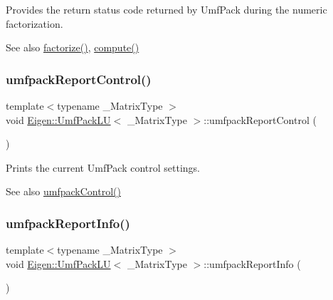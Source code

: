 Provides the return status code returned by Umf\+Pack during the numeric factorization.

\begin{DoxySeeAlso}{See also}
\mbox{\hyperlink{class_eigen_1_1_umf_pack_l_u_a1471bf890503e743c45d75cc02a5345d}{factorize()}}, \mbox{\hyperlink{class_eigen_1_1_umf_pack_l_u_a05fb2b5717ebd67e46b83439721ceee7}{compute()}} 
\end{DoxySeeAlso}
\mbox{\label{class_eigen_1_1_umf_pack_l_u_ac6ff58ef8eb8221e6af87de750d6619b}} 
\subsubsection{\texorpdfstring{umfpackReportControl()}{umfpackReportControl()}}
{\footnotesize\ttfamily template$<$typename \+\_\+\+Matrix\+Type $>$ \\
void \mbox{\hyperlink{class_eigen_1_1_umf_pack_l_u}{Eigen\+::\+Umf\+Pack\+LU}}$<$ \+\_\+\+Matrix\+Type $>$\+::umfpack\+Report\+Control (\begin{DoxyParamCaption}{ }\end{DoxyParamCaption})\hspace{0.3cm}{\ttfamily [inline]}}

Prints the current Umf\+Pack control settings.

\begin{DoxySeeAlso}{See also}
\mbox{\hyperlink{class_eigen_1_1_umf_pack_l_u_a679bd267a0407d4ca985d97f0b864101}{umfpack\+Control()}} 
\end{DoxySeeAlso}
\mbox{\label{class_eigen_1_1_umf_pack_l_u_afad062dfc49ca6d2d19d534b3f8f8d28}} 
\subsubsection{\texorpdfstring{umfpackReportInfo()}{umfpackReportInfo()}}
{\footnotesize\ttfamily template$<$typename \+\_\+\+Matrix\+Type $>$ \\
void \mbox{\hyperlink{class_eigen_1_1_umf_pack_l_u}{Eigen\+::\+Umf\+Pack\+LU}}$<$ \+\_\+\+Matrix\+Type $>$\+::umfpack\+Report\+Info (\begin{DoxyParamCaption}{ }\end{DoxyParamCaption})\hspace{0.3cm}{\ttfamily [inline]}}

